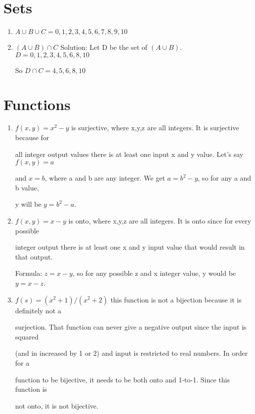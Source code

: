 \documentclass[11pt]{article}
\begin{document}
\section{Sets}

\begin{enumerate}[label=(\alph*)]

\item
$A\cup B\cup C={0,1,2,3,4,5,6,7,8,9,10}$

\item
$(A\cup B)\cap C$ Solution: Let D be the set of $(A\cup B)$. $D={0,1,2,3,4,5,6,8,10}$

So $D\cap C={4,5,6,8,10}$
\end{enumerate}



\section{Functions}

\begin{enumerate}[label=(\alph*)]

\item
$f(x,y)=x^2-y$ is surjective, where x,y,z are all integers. It is surjective because for 

all integer output values there is at least one input x and y value. Let's say $f(x,y)=a$ 

and $x=b$, where a and b are any integer. We get $a=b^2-y$, so for any a and b value,

y will be $y=b^2-a$. 

\item
$f(x,y)=x-y$ is onto, where x,y,z are all integers. It is onto since for every possible

integer output there is at least one x and y input value that would result in that output.

Formula: $z=x-y$, so for any possible z and x integer value, y would be $y=x-z$. 

\item
$f(s)=(x^2+1)/(x^2+2)$ this function is not a bijection because it is definitely not a 

surjection. That function can never give a negative output since the input is squared 

(and in increased by 1 or 2) and input is restricted to real numbers. In order for a 

function to be bijective, it needs to be both onto and 1-to-1. Since this function is

not onto, it is not bijective.

\end{enumerate}
\end{document}
